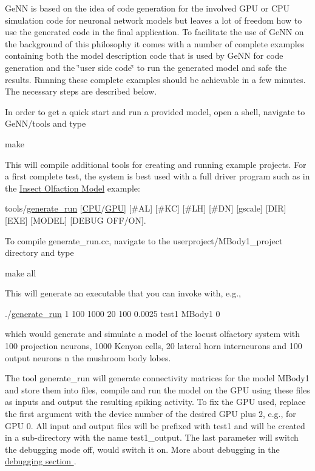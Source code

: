 Ge\+N\+N is based on the idea of code generation for the involved G\+P\+U or C\+P\+U simulation code for neuronal network models but leaves a lot of freedom how to use the generated code in the final application. To facilitate the use of Ge\+N\+N on the background of this philosophy it comes with a number of complete examples containing both the model description code that is used by Ge\+N\+N for code generation and the \char`\"{}user side code\char`\"{} to run the generated model and safe the results. Running these complete examples should be achievable in a few minutes. The necessary steps are described below.

In order to get a quick start and run a provided model, open a shell, navigate to {\ttfamily Ge\+N\+N/tools} and type 
\begin{DoxyCode}
make
\end{DoxyCode}
 This will compile additional tools for creating and running example projects. For a first complete test, the system is best used with a full driver program such as in the \hyperlink{2_examples_ex_mbody}{Insect Olfaction Model} example\+: 
\begin{DoxyCode}
tools/\hyperlink{userproject_2MBody__userdef__project_2README_8txt_a320a215d1e27b4de394be70e90d22863}{generate\_run} [\hyperlink{README_8txt_a74a069e3c75797de2636c4dd14daa147}{CPU}/\hyperlink{modelSpec_8h_a39cb9803524b6f3b783344b2f89867b4}{GPU}] [#AL] [#KC] [#LH] [#DN] [gscale] [DIR] [EXE] [MODEL] [DEBUG 
      OFF/ON]. 
\end{DoxyCode}
 To compile {\ttfamily generate\+\_\+run.\+cc}, navigate to the {\ttfamily userproject/\+M\+Body1\+\_\+project} directory and type 
\begin{DoxyCode}
make all
\end{DoxyCode}
 This will generate an executable that you can invoke with, e.\+g., 
\begin{DoxyCode}
./\hyperlink{userproject_2MBody__userdef__project_2README_8txt_a320a215d1e27b4de394be70e90d22863}{generate\_run} 1 100 1000 20 100 0.0025 test1 MBody1 0 
\end{DoxyCode}
 which would generate and simulate a model of the locust olfactory system with 100 projection neurons, 1000 Kenyon cells, 20 lateral horn interneurons and 100 output neurons n the mushroom body lobes.

The tool generate\+\_\+run will generate connectivity matrices for the model {\ttfamily M\+Body1} and store them into files, compile and run the model on the G\+P\+U using these files as inputs and output the resulting spiking activity. To fix the G\+P\+U used, replace the first argument {} with the device number of the desired G\+P\+U plus 2, e.\+g., {} for G\+P\+U 0. All input and output files will be prefixed with {\ttfamily test1} and will be created in a sub-\/directory with the name {\ttfamily test1\+\_\+output}. The last parameter {} will switch the debugging mode off, {} would switch it on. More about debugging in the \hyperlink{}{debugging section }.

